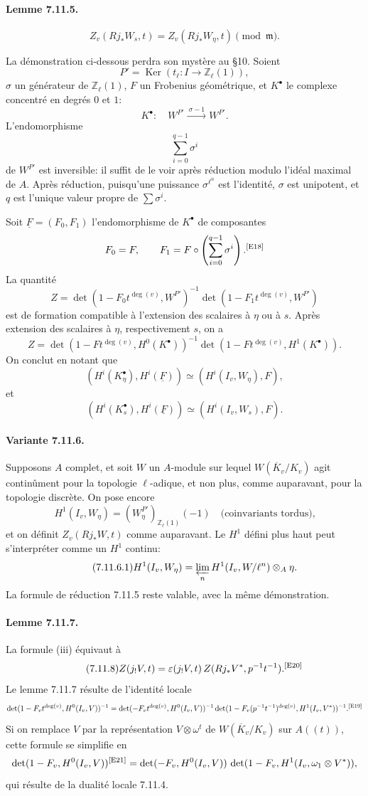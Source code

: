 \documentclass[10pt,letterpaper]{article}
\providecommand{\Ker}{\operatorname{Ker}}
\providecommand{\Ker}{\operatorname{Ker}}
\newcommand{\auditmark}[1]{\textsuperscript{\normalfont\scriptsize[E#1]}}
\begin{document}
\paragraph{Lemme 7.11.5.}
\[
Z_v(Rj_*W_s,t)=Z_v(Rj_*W_\eta,t)\pmod{\mathfrak m}.
\]

La démonstration ci-dessous perdra son mystère au §10. Soient
\[
P'=\Ker(t_\ell:I\to\mathbb Z_\ell(1)),
\]
\(\sigma\) un générateur de \(\mathbb Z_\ell(1)\), \(F\) un Frobenius géométrique, et \(K^\bullet\) le complexe concentré en degrés \(0\) et \(1\):
\[
K^\bullet:\quad W^{P'}\xrightarrow{\ \sigma-1\ } W^{P'}.
\]
L'endomorphisme
\[
\sum_{i=0}^{q-1}\sigma^i
\]
de \(W^{P'}\) est inversible: il suffit de le voir après réduction modulo l'idéal maximal de \(A\). Après réduction, puisqu'une puissance \(\sigma^{\ell^n}\) est l'identité, \(\sigma\) est unipotent, et \(q\) est l'unique valeur propre de \(\sum\sigma^i\).

Soit \(\underline F=(F_0,F_1)\) l'endomorphisme de \(K^\bullet\) de composantes
\[
F_0=F,\qquad
F_1=F\circ\left(\sum_{i=0}^{q-1}\sigma^i\right).\auditmark{18}
\]
La quantité
\[
Z=\det(1-F_0t^{\deg(v)},W^{P'})^{-1}
\det(1-F_1t^{\deg(v)},W^{P'})
\]
est de formation compatible à l'extension des scalaires à \(\eta\) ou à \(s\). Après extension des scalaires à \(\eta\), respectivement \(s\), on a
\[
Z=\det(1-Ft^{\deg(v)},H^0(K^\bullet))^{-1}
\det(1-Ft^{\deg(v)},H^1(K^\bullet)).
\]
On conclut en notant que
\[
(H^i(K_\eta^\bullet),H^i(\underline F))\simeq(H^i(I_v,W_\eta),F),
\]
et
\[
(H^i(K_s^\bullet),H^i(\underline F))\simeq(H^i(I_v,W_s),F).
\]

\paragraph{Variante 7.11.6.} Supposons \(A\) complet, et soit \(W\) un \(A\)-module sur lequel \(W(\overline K_v/K_v)\) agit continûment pour la topologie \(\ell\)-adique, et non plus, comme auparavant, pour la topologie discrète. On pose encore
\[
H^1(I_v,W_\eta)=(W_\eta^{P'})_{\mathbb Z_\ell(1)}(-1)
\quad\text{(coinvariants tordus),}
\]
et on définit \(Z_v(Rj_*W,t)\) comme auparavant. Le \(H^1\) défini plus haut peut s'interpréter comme un \(H^1\) continu:
\[
\tag{7.11.6.1}
H^1(I_v,W_\eta)=
\varprojlim_n H^1(I_v,W/\ell^n)\otimes_A\eta.
\]
La formule de réduction 7.11.5 reste valable, avec la même démonstration.

\paragraph{Lemme 7.11.7.} La formule (iii) équivaut à
\[
\tag{7.11.8}
Z(j_!V,t)=\varepsilon(j_!V,t)\,Z(Rj_*V^*,p^{-1}t^{-1}).\auditmark{20}
\]
Le lemme 7.11.7 résulte de l'identité locale
\[
\det(1-F_vt^{\deg(v)},H^0(I_v,V))^{-1}
=
\det(-F_vt^{\deg(v)},H^0(I_v,V))^{-1}
\det(1-F_v(p^{-1}t^{-1})^{\deg(v)},H^1(I_v,V^*))^{-1}.\auditmark{19}
\]
Si on remplace \(V\) par la représentation \(V\otimes\omega^t\) de \(W(\overline K_v/K_v)\) sur \(A((t))\), cette formule se simplifie en
\[
\det(1-F_v,H^0(I_v,V))\auditmark{21}
=
\det(-F_v,H^0(I_v,V))\,
\det(1-F_v,H^1(I_v,\omega_1\otimes V^*)),
\]
qui résulte de la dualité locale 7.11.4.
\end{document}
